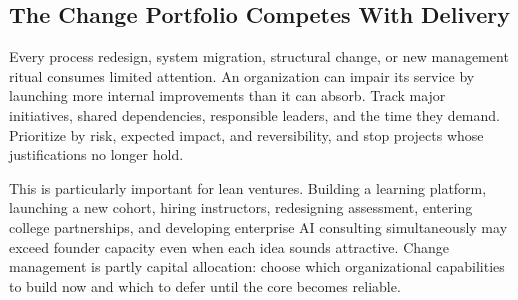 \subsection{The Change Portfolio Competes With Delivery}
\label{sec:change_portfolio_competess_delivery}

Every process redesign, system migration, structural change, or new management ritual consumes limited attention. An organization can impair its service by launching more internal improvements than it can absorb. Track major initiatives, shared dependencies, responsible leaders, and the time they demand. Prioritize by risk, expected impact, and reversibility, and stop projects whose justifications no longer hold.

This is particularly important for lean ventures. Building a learning platform, launching a new cohort, hiring instructors, redesigning assessment, entering college partnerships, and developing enterprise AI consulting simultaneously may exceed founder capacity even when each idea sounds attractive. Change management is partly capital allocation: choose which organizational capabilities to build now and which to defer until the core becomes reliable.
